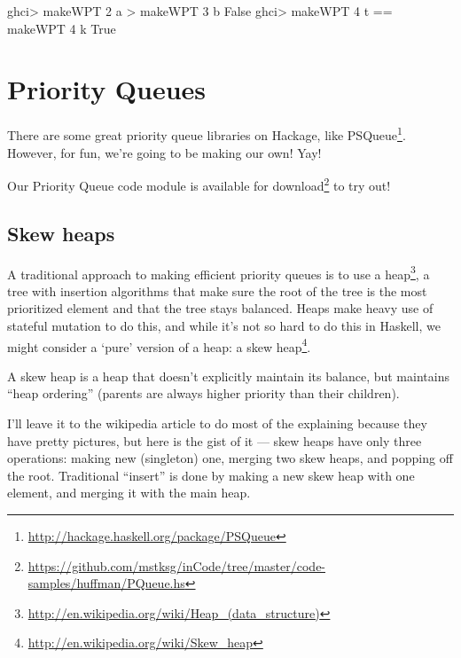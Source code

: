 \documentclass[]{article}
\newenvironment{Shaded}{}{}
\newcommand{\CharTok}[1]{\textcolor[rgb]{0.25,0.44,0.63}{#1}}
\newcommand{\DataTypeTok}[1]{\textcolor[rgb]{0.56,0.13,0.00}{#1}}
\newcommand{\DecValTok}[1]{\textcolor[rgb]{0.25,0.63,0.44}{#1}}
\newcommand{\NormalTok}[1]{#1}
\newcommand{\OperatorTok}[1]{\textcolor[rgb]{0.40,0.40,0.40}{#1}}
\renewcommand{\href}[2]{#2\footnote{\url{#1}}}
\begin{document}
\begin{Shaded}
\begin{Highlighting}[]
\NormalTok{ghci}\OperatorTok{\textgreater{}}\NormalTok{ makeWPT }\DecValTok{2} \CharTok{\textquotesingle{}a\textquotesingle{}} \OperatorTok{\textgreater{}}\NormalTok{ makeWPT }\DecValTok{3} \CharTok{\textquotesingle{}b\textquotesingle{}}
\DataTypeTok{False}
\NormalTok{ghci}\OperatorTok{\textgreater{}}\NormalTok{ makeWPT }\DecValTok{4} \CharTok{\textquotesingle{}t\textquotesingle{}} \OperatorTok{==}\NormalTok{ makeWPT }\DecValTok{4} \CharTok{\textquotesingle{}k\textquotesingle{}}
\DataTypeTok{True}
\end{Highlighting}
\end{Shaded}

\section{Priority Queues}\label{priority-queues}

There are some great priority queue libraries on Hackage, like
\href{http://hackage.haskell.org/package/PSQueue}{PSQueue}. However, for fun,
we're going to be making our own! Yay!

Our Priority Queue code module is
\href{https://github.com/mstksg/inCode/tree/master/code-samples/huffman/PQueue.hs}{available
for download} to try out!

\subsection{Skew heaps}\label{skew-heaps}

A traditional approach to making efficient priority queues is to use a
\href{http://en.wikipedia.org/wiki/Heap_(data_structure)}{heap}, a tree with
insertion algorithms that make sure the root of the tree is the most prioritized
element and that the tree stays balanced. Heaps make heavy use of stateful
mutation to do this, and while it's not so hard to do this in Haskell, we might
consider a `pure' version of a heap: a
\href{http://en.wikipedia.org/wiki/Skew_heap}{skew heap}.

A skew heap is a heap that doesn't explicitly maintain its balance, but
maintains ``heap ordering'' (parents are always higher priority than their
children).

I'll leave it to the wikipedia article to do most of the explaining because they
have pretty pictures, but here is the gist of it --- skew heaps have only three
operations: making new (singleton) one, merging two skew heaps, and popping off
the root. Traditional ``insert'' is done by making a new skew heap with one
element, and merging it with the main heap.
\end{document}
